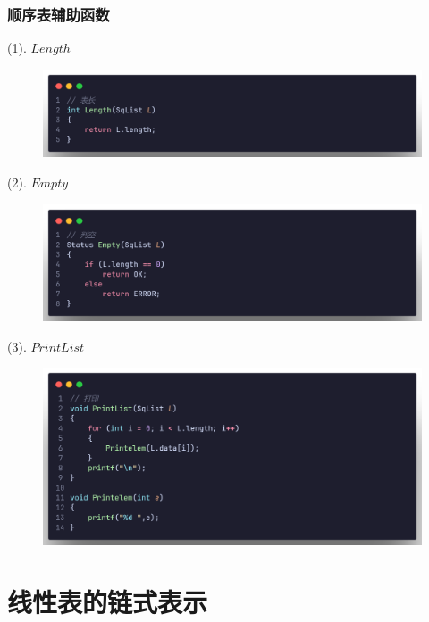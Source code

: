 \subsubsection{顺序表辅助函数}

(1). $Length$ 

\begin{figure}[H]
    \centering
    \includegraphics[scale=0.2]{"figure/Note/LinearList/SqLen.png"}
\end{figure} 

(2). $Empty$ 

\begin{figure}[H]
    \centering
    \includegraphics[scale=0.2]{"figure/Note/LinearList/SqEmpty.png"}
\end{figure} 

(3). $PrintList$

\begin{figure}[H]
    \centering
    \includegraphics[scale=0.2]{"figure/Note/LinearList/SqPrint.png"}
\end{figure} 

\section{线性表的链式表示}
